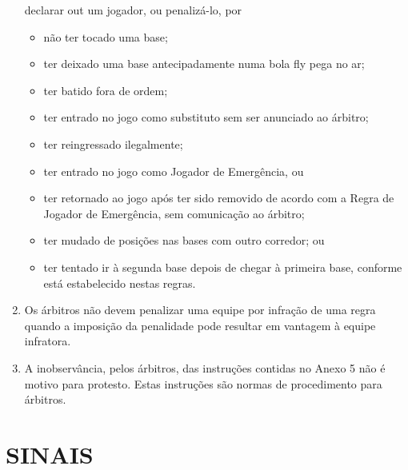 \begin{enumerate}[label=(\alph*)]
 declarar \gls{out} um jogador, ou
  penalizá-lo, por
  \begin{itemize}
  	\item não ter tocado uma base;
  	\item ter deixado uma base antecipadamente numa bola \gls{fly} pega no ar;
  	\item ter batido fora de ordem;
	\item ter entrado no jogo como substituto sem ser anunciado ao árbitro;
	\item ter reingressado ilegalmente;
	\item ter entrado no jogo como Jogador de Emergência, ou
	\item ter retornado ao jogo após ter sido removido de acordo com a Regra de Jogador de Emergência, sem comunicação ao árbitro;
	\item ter mudado de posições nas bases com outro corredor; ou
	\item ter tentado ir à segunda base depois de chegar à primeira base, conforme está estabelecido nestas regras.
  \end{itemize}

\item   Os árbitros não devem penalizar uma equipe por infração de uma regra quando a imposição da penalidade pode resultar em vantagem à equipe infratora.
\item  A inobservância, pelos árbitros, das instruções contidas no Anexo 5 não é motivo para protesto. Estas instruções são normas de procedimento para árbitros.
\end{enumerate}

\section{SINAIS}

